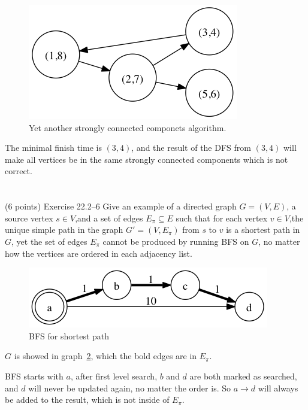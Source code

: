 \documentclass[paper=a4, fontsize=11pt]{scrartcl} %
\begin{document}
\begin{figure}[hp]
  \centering
  \includegraphics[width=.7\textwidth]{9-3.gv.png}
  \caption{Yet another strongly connected componets algorithm.}
\label{fig:scc}
\end{figure}

The minimal finish time is $(3,4)$, and the result of the DFS from
$(3,4)$ will make all vertices be in the same strongly connected
components which is not correct.

\pagebreak


\section{}

\begin{fancyquotes}
  (6 points) Exercise 22.2--6 Give an example of a directed graph
  $G=(V,E)$, a source vertex $s\in V$,and a set of edges $E_{\pi}\subseteq
  E$ such that for each vertex $v\in V$,the unique simple path in the
  graph $G'=(V,E_{\pi})$ from $s$ to $v$ is a shortest path in $G$,
  yet the set of edges $E_{\pi}$ cannot be produced by running BFS on
  $G$, no matter how the vertices are ordered in each adjacency list.
\end{fancyquotes}

\begin{figure}[hp]
  \centering
  \includegraphics[width=.7\textwidth]{9-4.gv.png}
  \caption{BFS for shortest path}
  \label{fig:bsp}
\end{figure}

$G$ is showed in graph~\ref{fig:bsp}, which the bold edges are in
$E_{\pi}$.

BFS starts with $a$, after first level search, $b$ and $d$ are both
marked as searched, and $d$ will never be updated again, no matter the
order is. So $a\rightarrow d$ will always be added to the result,
which is not inside of $E_\pi$.

\pagebreak
\end{document}

